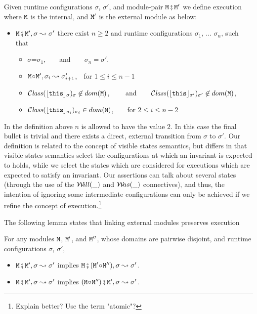 \begin{definition}
Given runtime configurations $\sigma$,  $\sigma'$,  and module-pair $\M \mkpair \M'$ we define
execution where $\M$ is the internal, and $\M'$ is the external module as below:
\label{def:module_pair_execution} 
\begin{itemize}
\item
$\M \mkpair \M', \sigma \leadsto \sigma'$ \IFF
there exist  $n\geq 2$ and runtime configurations $\sigma_1$,  ...
$\sigma_n$, such that
\begin{itemize}
\item
$\sigma$=$\sigma_1$,\ \  \ \ and\ \ \ \ $\sigma_n=\sigma'$.
\item
$\M \link \M', \sigma_i \leadsto \sigma_{i+1}'$,\  \  for $1\leq i \leq n\!-\!1$
\item
$\ClassOf{\interp {\this} {\sigma}} {\sigma}\not\in dom({\M})$,  \ \  \ \ and\ \ \ \
$\ClassOf{\interp {\this} {\sigma'}} {\sigma'} \not\in dom({\M})$,
\item
 $\ClassOf{\interp {\this} {\sigma_i}} {\sigma_i} \in dom({\M})$,\ \ \ \ for $2\leq i \leq n\!-\!2$
\end{itemize}
\end{itemize}

\end{definition}

In the definition above $n$ is allowed to have the value $2$. In this case the final bullet is trivial and  there exists a direct, external transition from $\sigma$ to $\sigma'$.  Our definition is related to the concept of visible states semantics, but differs in that visible states semantics select the configurations at which an invariant is expected to holds, while we select the states which are considered for executions which are expected to satisfy an invariant. Our assertions can talk about several states (through the use of the $\Future {\_}$ and $\Past{\_}$ connectives), and thus, the intention of ignoring some intermediate configurations can only be achieved if we refine the concept of execution.\footnote{Explain better? Use the term "atomic"?}


The following lemma states that linking external modules preserves execution

\begin{lemma}
\label{lemma:module_pair_execution}
For any modules $\M$, $\M'$, and $\M''$, whose domains are pairwise disjoint, and runtime configurations $\sigma$, $\sigma'$,

\begin{itemize}
\item
 $\M \mkpair \M', \sigma \leadsto \sigma'$  implies $\M \mkpair (\M'\link\M'') ,\sigma \leadsto \sigma'$.  
\item
  $\M \mkpair \M', \sigma \leadsto \sigma'$  implies
$(\M\link\M'') \mkpair \M' , \sigma \leadsto \sigma'$.

\end{itemize}
\end{lemma}

